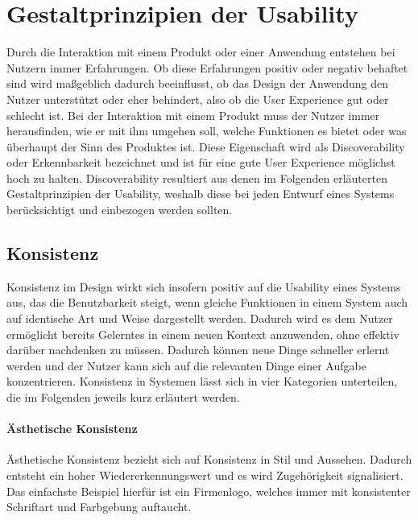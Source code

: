 \section{Gestaltprinzipien der Usability}
Durch die Interaktion mit einem Produkt oder einer Anwendung entstehen bei Nutzern immer Erfahrungen.
Ob diese Erfahrungen positiv oder negativ behaftet sind wird maßgeblich dadurch beeinflusst, ob das Design der Anwendung den Nutzer unterstützt oder eher behindert, also ob die User Experience gut oder schlecht ist.
Bei der Interaktion mit einem Produkt muss der Nutzer immer herausfinden, wie er mit ihm umgehen soll, welche Funktionen es bietet oder was überhaupt der Sinn des Produktes ist.
Diese Eigenschaft wird als Discoverability oder Erkennbarkeit bezeichnet und ist für eine gute User Experience möglichst hoch zu halten.
Discoverability resultiert aus denen im  Folgenden erläuterten Gestaltprinzipien der Usability, weshalb diese bei jeden Entwurf eines Systems berücksichtigt und einbezogen werden sollten\cite{Norman.2016}.

\subsection*{Konsistenz}
Konsistenz im Design wirkt sich insofern positiv auf die Usability eines Systems aus, das die Benutzbarkeit steigt, wenn gleiche Funktionen in einem System auch auf identische Art und Weise dargestellt werden.
Dadurch wird es dem Nutzer ermöglicht bereits Gelerntes in einem neuen Kontext anzuwenden, ohne effektiv darüber nachdenken zu müssen.
Dadurch können neue Dinge schneller erlernt werden und der Nutzer kann sich auf die relevanten Dinge einer Aufgabe konzentrieren.
Konsistenz in Systemen lässt sich in vier Kategorien unterteilen, die im Folgenden jeweils kurz erläutert werden.

\paragraph{Ästhetische Konsistenz}
Ästhetische Konsistenz bezieht sich auf Konsistenz in Stil und Aussehen. Dadurch entsteht ein hoher Wiedererkennungswert und es wird Zugehörigkeit signalisiert. Das einfachste Beispiel hierfür ist ein Firmenlogo, welches immer mit konsistenter Schriftart und Farbgebung auftaucht.


